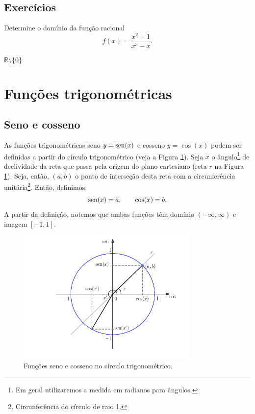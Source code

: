 \subsection*{Exercícios}

\begin{exer}
  Determine o domínio da função racional
  \begin{equation}
    f(x) = \frac{x^2-1}{x^3-x}.
  \end{equation}
\end{exer}
\begin{resp}
  $\mathbb{R}\setminus\{0\}$
\end{resp}


\section{Funções trigonométricas}\label{cap_funcao_sec_funtri}

\subsection{Seno e cosseno}

As funções trigonométricas seno $y=\operatorname{sen}(x)$ e cosseno $y=\cos(x)$ podem ser definidas a partir do círculo trigonométrico (veja a Figura \ref{fig:cos_seno}). Seja $x$ o ângulo\footnote{Em geral utilizaremos a medida em radianos para ângulos.} de declividade da reta que passa pela origem do plano cartesiano (reta $r$ na Figura \ref{fig:cos_seno}). Seja, então, $(a,b)$ o ponto de interseção desta reta com a circunferência unitária\footnote{Circunferência do círculo de raio 1.}. Então, definimos:
\begin{equation}
  \operatorname{sen}(x) = a,\qquad \cos(x) = b.
\end{equation}
A partir da definição, notemos que ambas funções têm domínio $(-\infty, \infty)$ e imagem $[-1, 1]$.

\begin{figure}[H]
  \centering
  \includegraphics[width=0.8\textwidth]{./cap_funcao/dados/fig_cos_seno/fig_cos_seno}
  \caption{Funções seno e cosseno no círculo trigonométrico.}
  \label{fig:cos_seno}
\end{figure}

